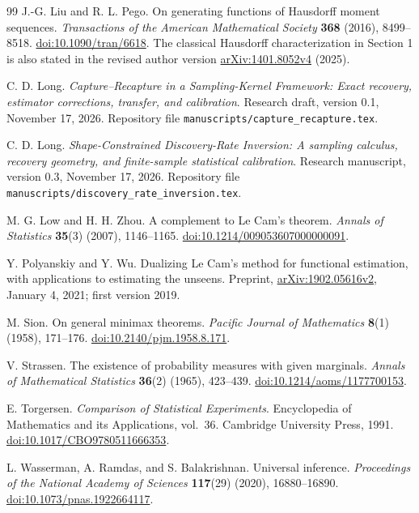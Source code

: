 \documentclass[11pt]{article}
\numberwithin{equation}{section}
\theoremstyle{definition}
\theoremstyle{remark}
\begin{document}
\begin{thebibliography}{99}
J.-G. Liu and R. L. Pego. On generating functions of Hausdorff moment sequences.
\emph{Transactions of the American Mathematical Society} \textbf{368} (2016), 8499--8518.
\href{https://doi.org/10.1090/tran/6618}{doi:10.1090/tran/6618}.
The classical Hausdorff characterization in Section 1 is also stated in the revised author version
\href{https://arxiv.org/abs/1401.8052v4}{arXiv:1401.8052v4} (2025).

C. D. Long. \emph{Capture--Recapture in a Sampling-Kernel Framework:
Exact recovery, estimator corrections, transfer, and calibration}.
Research draft, version 0.1, November 17, 2026.
Repository file \texttt{manuscripts/capture\_recapture.tex}.

C. D. Long. \emph{Shape-Constrained Discovery-Rate Inversion: A sampling calculus, recovery geometry, and finite-sample statistical calibration}.
Research manuscript, version 0.3, November 17, 2026.
Repository file \texttt{manuscripts/discovery\_rate\_inversion.tex}.

M. G. Low and H. H. Zhou. A complement to Le Cam's theorem.
\emph{Annals of Statistics} \textbf{35}(3) (2007), 1146--1165.
\href{https://doi.org/10.1214/009053607000000091}{doi:10.1214/009053607000000091}.

Y. Polyanskiy and Y. Wu. Dualizing Le Cam's method for functional estimation, with applications to estimating the unseens.
Preprint, \href{https://arxiv.org/abs/1902.05616v2}{arXiv:1902.05616v2}, January 4, 2021; first version 2019.

M. Sion. On general minimax theorems.
\emph{Pacific Journal of Mathematics} \textbf{8}(1) (1958), 171--176.
\href{https://doi.org/10.2140/pjm.1958.8.171}{doi:10.2140/pjm.1958.8.171}.

V. Strassen. The existence of probability measures with given marginals.
\emph{Annals of Mathematical Statistics} \textbf{36}(2) (1965), 423--439.
\href{https://doi.org/10.1214/aoms/1177700153}{doi:10.1214/aoms/1177700153}.

E. Torgersen. \emph{Comparison of Statistical Experiments}.
Encyclopedia of Mathematics and its Applications, vol.\ 36. Cambridge University Press, 1991.
\href{https://doi.org/10.1017/CBO9780511666353}{doi:10.1017/CBO9780511666353}.

L. Wasserman, A. Ramdas, and S. Balakrishnan. Universal inference.
\emph{Proceedings of the National Academy of Sciences} \textbf{117}(29) (2020), 16880--16890.
\href{https://doi.org/10.1073/pnas.1922664117}{doi:10.1073/pnas.1922664117}.
\end{thebibliography}
\endgroup
\end{document}
